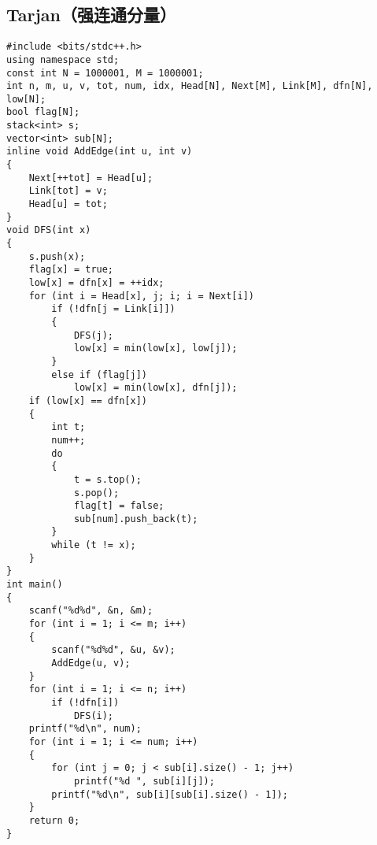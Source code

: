 \documentclass[a4paper]{article}
\begin{document}
\subsection{Tarjan（强连通分量）}
\begin{lstlisting}
#include <bits/stdc++.h>
using namespace std;
const int N = 1000001, M = 1000001;
int n, m, u, v, tot, num, idx, Head[N], Next[M], Link[M], dfn[N], low[N];
bool flag[N];
stack<int> s;
vector<int> sub[N];
inline void AddEdge(int u, int v)
{
    Next[++tot] = Head[u];
    Link[tot] = v;
    Head[u] = tot;
}
void DFS(int x)
{
    s.push(x);
    flag[x] = true;
    low[x] = dfn[x] = ++idx;
    for (int i = Head[x], j; i; i = Next[i])
        if (!dfn[j = Link[i]])
        {
            DFS(j);
            low[x] = min(low[x], low[j]);
        }
        else if (flag[j])
            low[x] = min(low[x], dfn[j]);
    if (low[x] == dfn[x])
    {
        int t;
        num++;
        do
        {
            t = s.top();
            s.pop();
            flag[t] = false;
            sub[num].push_back(t);
        }
        while (t != x);
    }
}
int main()
{
    scanf("%d%d", &n, &m);
    for (int i = 1; i <= m; i++)
    {
        scanf("%d%d", &u, &v);
        AddEdge(u, v);
    }
    for (int i = 1; i <= n; i++)
        if (!dfn[i])
            DFS(i);
    printf("%d\n", num);
    for (int i = 1; i <= num; i++)
    {
        for (int j = 0; j < sub[i].size() - 1; j++)
            printf("%d ", sub[i][j]);
        printf("%d\n", sub[i][sub[i].size() - 1]);
    }
    return 0;
}
\end{lstlisting}
\end{document}
